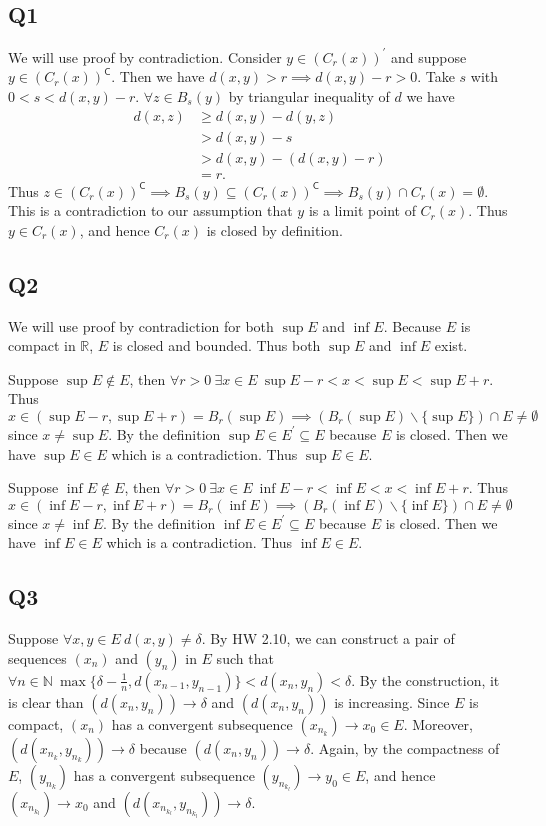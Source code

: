 \documentclass[12pt,lettersize]{article}
\newcommand{\R}{\mathbb{R}}
\newcommand{\N}{\mathbb{N}}
\newcommand{\com}{\mathsf{C}}
\begin{document}
	
	\subsection*{Q1}
	We will use proof by contradiction. Consider $y\in\left(C_r(x)\right)^\prime$ and suppose $y\in\left(C_r(x)\right)^\com$. Then we have $d(x,y)>r\implies d(x,y)-r>0$. Take $s$ with $0<s<d(x,y)-r$. $\forall z\in B_s(y)$ by triangular inequality of $d$ we have
	\begin{align*}
		d(x,z) &\geq d(x,y)-d(y,z)\\
			   &> d(x,y)-s\\
			   &> d(x,y)-(d(x,y)-r)\\
			   &= r.
	\end{align*} 
	Thus $z\in (C_r(x))^\com\implies B_s(y)\subseteq (C_r(x))^\com \implies B_s(y)\cap C_r(x)=\emptyset.$ This is a contradiction to our assumption that $y$ is a limit point of $C_r(x)$. Thus $y\in C_r(x)$, and hence $C_r(x)$ is closed by definition.
	\newpage
	
	\subsection*{Q2}
	We will use proof by contradiction for both $\sup E$ and $\inf E$. Because $E$ is compact in $\R$, $E$ is closed and bounded. Thus both $\sup E$ and $\inf E$ exist.
	
	Suppose $\sup E\notin E$, then $\forall r>0\ \exists x\in E\ \sup E-r<x<\sup E<\sup E+r$. Thus $x\in(\sup E-r,\sup E+r)=B_r(\sup E)\implies (B_r(\sup E)\backslash\{\sup E\})\cap E\neq\emptyset$ since $x\neq\sup E$. By the definition $\sup E\in E^\prime\subseteq E$ because $E$ is closed. Then we have $\sup E\in E$ which is a contradiction. Thus $\sup E\in E$.
	
	Suppose $\inf E\notin E$, then $\forall r>0\ \exists x\in E\ \inf E-r<\inf E<x<\inf E+r$. Thus $x\in(\inf E-r,\inf E+r)=B_r(\inf E)\implies (B_r(\inf E)\backslash\{\inf E\})\cap E\neq\emptyset$ since $x\neq\inf E$. By the definition $\inf E\in E^\prime\subseteq E$ because $E$ is closed. Then we have $\inf E\in E$ which is a contradiction. Thus $\inf E\in E$.
	\newpage
	
	\subsection*{Q3}
	Suppose $\forall x,y\in E\ d(x,y)\neq\delta$. By HW 2.10, we can construct a pair of sequences $(x_n)$ and $(y_n)$ in $E$ such that $\forall n\in\N\ \max\{\delta-\frac{1}{n}, d(x_{n-1},y_{n-1})\}<d(x_n,y_n)<\delta$. By the construction, it is clear than $(d(x_n,y_n))\rightarrow\delta$ and $(d(x_n,y_n))$ is increasing. Since $E$ is compact, $(x_n)$ has a convergent subsequence $(x_{n_k})\rightarrow x_0\in E$. Moreover, $(d(x_{n_k},y_{n_k}))\rightarrow\delta$ because $(d(x_n,y_n))\rightarrow\delta$. Again, by the compactness of $E$, $(y_{n_k})$ has a convergent subsequence $(y_{n_{k_l}})\rightarrow y_0\in E$, and hence $(x_{n_{k_l}})\rightarrow x_0$ and  $(d(x_{n_{k_l}},y_{n_{k_l}}))\rightarrow\delta$.\smallskip
	
\end{document}
